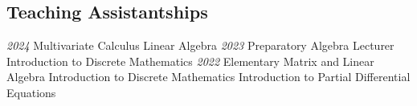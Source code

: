 \documentclass[a4paper]{cv-friggeri}
\begin{document}
\begin{aside}
\section{Teaching Assistantships}
\emph{2024}
Multivariate Calculus
Linear Algebra
\emph{2023}
Preparatory Algebra Lecturer
Introduction to Discrete Mathematics
\emph{2022}
Elementary Matrix and Linear Algebra
Introduction to Discrete Mathematics
Introduction to Partial Differential Equations
\end{aside}


\end{document}
